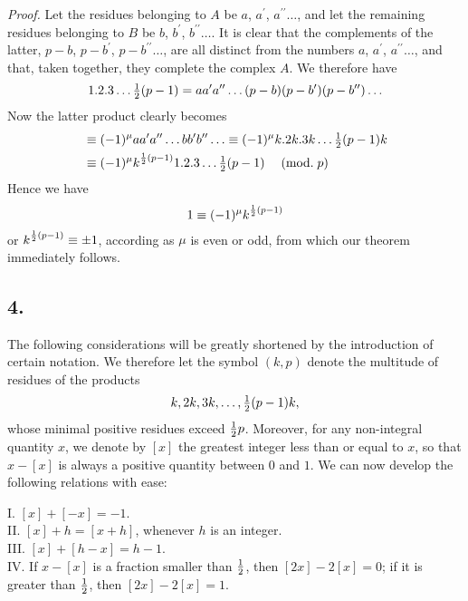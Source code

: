 \documentclass[twoside,12pt]{memoir}
\renewcommand{\pmod}[1]{\;(\textrm{mod.}\;#1)}
\let\oldfrac\frac
\def\frac#1#2{\mathchoice{\tfrac{#1}{#2}}{\oldfrac{#1}{#2}}{\genfrac{}{}{}{2}{#1}{#2\mathstrut}}{\genfrac{}{}{}{3}{#1}{#2\mathstrut}}}
\begin{document}
\textit{Proof.} Let the residues belonging to \(A\) be \(a\), \(a^{\prime}\), \(a^{\prime \prime} \ldots\), and let the remaining residues belonging to \(B\) be \(b\), \(b^{\prime}\), \(b^{\prime \prime} \ldots\). It is clear that the complements of the latter, \(p-b\), \(p-b^{\prime}\), \(p-b^{\prime \prime} \ldots\), are all distinct from the numbers \(a\), \(a^{\prime}\), \(a^{\prime \prime} \ldots\), and that, taken together, they complete the complex \(A\). \pagebreak%
We therefore have
\[1 . 2 . 3 \ldots \frac{1}{2}(p-1)=a a^{\prime} a^{\prime \prime} \ldots(p-b)(p-b^{\prime})(p-b^{\prime \prime}) \ldots\]
Now the latter product clearly becomes
\[\begin{aligned}
& \equiv(-1)^{\mu} a a^{\prime} a^{\prime \prime} \ldots b b^{\prime} b^{\prime \prime} \ldots \equiv(-1)^{\mu} k . 2 k .3 k \ldots \frac{1}{2}(p-1) k \\
& \equiv(-1)^{\mu} k^{\frac{1}{2}(p-1)} 1.2 .3 \ldots \frac{1}{2}(p-1) \quad\pmod{p}
\end{aligned}\]
Hence we have
\[1 \equiv(-1)^{\mu} k^{\frac{1}{2}(p-1)}\]
or \(k^{\frac{1}{2}(p-1)} \equiv \pm 1\), according as \(\mu\) is even or odd, from which our theorem immediately follows.

\subsection*{4.}

The following considerations will be greatly shortened by the introduction of certain notation. We therefore let the symbol \((k, p)\) denote the multitude of residues of the products
\[k, 2k, 3k, \ldots, \frac{1}{2}(p-1)k,\]
whose minimal positive residues exceed \(\frac{1}{2}p\). Moreover, for any non-integral quantity \(x\), we denote by \([x]\) the greatest integer less than or equal to \(x\), so that \(x-[x]\) is always a positive quantity between \(0\) and \(1\). We can now develop the following relations with ease:

I. \([x]+[-x]=-1\).\\

II. \([x]+h=[x+h]\), whenever \(h\) is an integer.\\

III. \([x]+[h-x]=h-1\).\\

IV. If \(x-[x]\) is a fraction smaller than \(\frac{1}{2}\), then \([2x]-2[x]=0\); if it is greater than \(\frac{1}{2}\), then \([2x]-2[x]=1\).\\
\end{document}
